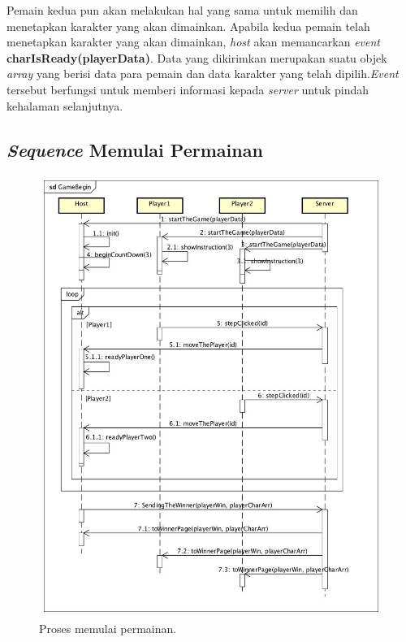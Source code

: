 Pemain kedua pun akan melakukan hal yang sama untuk memilih dan menetapkan karakter yang akan dimainkan. Apabila kedua pemain telah menetapkan karakter yang akan dimainkan, \textit{host} akan memancarkan \textit{event} \textbf{charIsReady(playerData)}. Data yang dikirimkan merupakan suatu objek \textit{array} yang berisi data para pemain dan data karakter yang telah dipilih.\textit{Event} tersebut berfungsi untuk memberi informasi kepada \textit{server} untuk pindah kehalaman selanjutnya.

\subsection{\textit{Sequence} Memulai Permainan}

\begin{figure}[H]
	\centering
	\includegraphics[scale=0.35]{Gambar/GameBegin}
	\caption{Proses memulai permainan.}
	\label{fig:3_GameBegin}
\end{figure}

